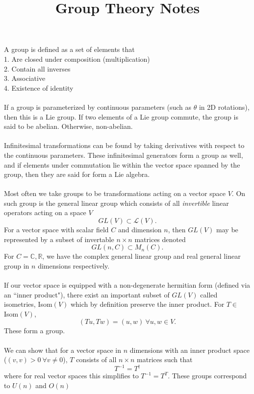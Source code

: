 \documentclass[10pt,letterpaper]{article}
\title{Group Theory Notes}
\author{}
\date{}
\begin{document}
\maketitle

\noindent A group is defined as a set of elements that 
\\
1. Are closed under composition (multiplication)
\\
2. Contain all inverses\\
3. Associative\\
4. Existence of identity\\
\\
If a group is parameterized by continuous parameters (such as $\theta$ in 2D rotations), then this is a Lie group. If two elements of a Lie group commute, the group is said to be abelian. Otherwise, non-abelian.
\\ \\
Infinitesimal transformations can be found by taking derivatives with respect to the continuous parameters. These infinitesimal generators form a group as well, and if elements under commutation lie within the vector space spanned by the group, then they are said for form a Lie algebra. \\
\\ 
Most often we take groups to be transformations acting on a vector space $V$. On such group is the general linear group
which consists of all \emph{invertible} linear operators acting on a space $V$
\[
	GL(V) \subset \mathcal L(V).
\] 
For a vector space with scalar field $C$ and dimension $n$, then $GL(V)$ may be represented by a subset of invertable
$n\times n$ matrices denoted
\[
	GL(n,C) \subset M_n(C).
\]
For $C=\mathbb C, \mathbb R$, we have the complex general linear group and real general linear group in $n$ dimensions respectively.\\
\\ 
If our vector space is equipped with a non-degenerate hermitian form (defined via an ``inner product"), there exist an important subset of $GL(V)$ called isometries, Isom$(V)$ which by definition preserve the inner product. For $T\in$ Isom$(V)$, 
\[
	(Tu,Tw) = (u,w)\  \forall u,w\in V.
\]
These form a group.
\\ \\
We can show that for a vector space in $n$ dimensions with an inner product space ($(v,v) >0\ \forall v\ne 0$), $T$ consists of all $n\times n$ matrices such that
\[
	T^{-1} = T^\dag
\]
where for real vector spaces this simplifies to $T^{-1} = T^T$. These groups correspond to $U(n)$ and $O(n)$
\end{document}
